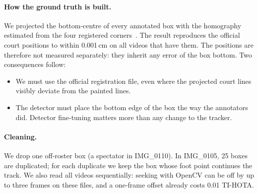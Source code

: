 \documentclass[11pt,a4paper]{article}
\begin{document}
\begin{table}[t]
\centering
\caption{Training and Challenge videos. The two splits differ in viewpoint, resolution, dynamic range and
compression.}
\label{tab:data}
\small
{}
\end{table}

\paragraph{How the ground truth is built.}
We projected the bottom-centre of every annotated box with the homography estimated from the four
registered corners~\cite{hartley}. The result reproduces the official court positions to within
0.001\,cm on all videos that have them. The positions are therefore not measured separately: they inherit
any error of the box bottom. Two consequences follow:
\begin{itemize}
\item We must use the official registration file, even where the projected court lines visibly deviate
from the painted lines.
\item The detector must place the bottom edge of the box the way the annotators did. Detector
fine-tuning matters more than any change to the tracker.
\end{itemize}

\paragraph{Cleaning.}
We drop one off-roster box (a spectator in IMG\_0110). In IMG\_0105, 25 boxes are duplicated; for each
duplicate we keep the box whose foot point continues the track. We also read all videos sequentially:
seeking with OpenCV can be off by up to three frames on these files, and a one-frame offset already costs
0.01 TI-HOTA.
\end{document}
